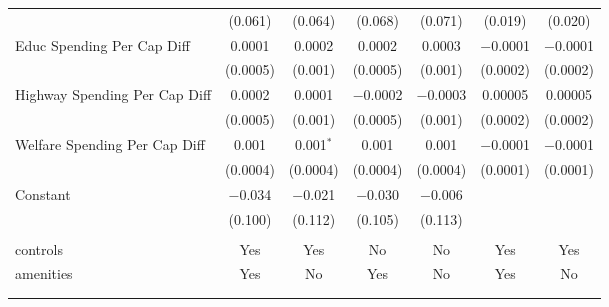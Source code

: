 \begin{table}[!htbp]
\begin{tabular}{@{\extracolsep{5pt}}lcccccc}
  & (0.061) & (0.064) & (0.068) & (0.071) & (0.019) & (0.020) \\ 
  Educ Spending Per Cap Diff & 0.0001 & 0.0002 & 0.0002 & 0.0003 & $-$0.0001 & $-$0.0001 \\ 
  & (0.0005) & (0.001) & (0.0005) & (0.001) & (0.0002) & (0.0002) \\ 
  Highway Spending Per Cap Diff & 0.0002 & 0.0001 & $-$0.0002 & $-$0.0003 & 0.00005 & 0.00005 \\ 
  & (0.0005) & (0.001) & (0.0005) & (0.001) & (0.0002) & (0.0002) \\ 
  Welfare Spending Per Cap Diff & 0.001 & 0.001$^{*}$ & 0.001 & 0.001 & $-$0.0001 & $-$0.0001 \\ 
  & (0.0004) & (0.0004) & (0.0004) & (0.0004) & (0.0001) & (0.0001) \\ 
  Constant & $-$0.034 & $-$0.021 & $-$0.030 & $-$0.006 &  &  \\ 
  & (0.100) & (0.112) & (0.105) & (0.113) &  &  \\ 
 \hline \\[-1.8ex] 
controls & Yes & Yes & No & No & Yes & Yes \\ 
amenities & Yes & No & Yes & No & Yes & No \\ 
\hline \\[-1.8ex] 
\hline 
\hline \\[-1.8ex] 
\end{tabular} 
\end{table} 
